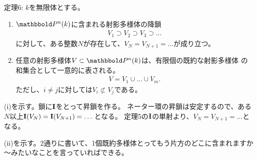 \begin{framed}
  定理6:
  $k$を無限体とする。
  \begin{enumerate}[label=(\roman*)]
    \item $\P^n(k)$に含まれる射影多様体の降鎖
    \begin{align}
      V_1 \supset V_2 \supset V_3 \supset \dots
    \end{align}
    に対して、ある整数$N$が存在して、$V_N = V_{N+1} = \dots$が成り立つ。
    \item
    任意の射影多様体$V\subset \P^n(k)$は、有限個の既約な射影多様体
    の和集合として一意的に表される。
    \begin{align}
      V=V_1 \cup \dots \cup V_m.
    \end{align}
    ただし、$i\neq j$に対しては$V_i \not\subset V_j$である。
  \end{enumerate}
\end{framed}
\begin{myproof}
  (i)を示す。鎖に$\textbf I$をとって昇鎖を作る。
  ネーター環の昇鎖は安定するので、ある$N$以上$\textbf I(V_N) = \textbf I(V_{N+1})=\dots$となる。
  定理5の$\textbf I$の単射より、$V_N = V_{N+1} = \dots$となる。

  (ii)を示す。2通りに書いて、1個既約多様体とってもう片方のどこに含まれますか～みたいなことを言っていればできる。
\end{myproof}

